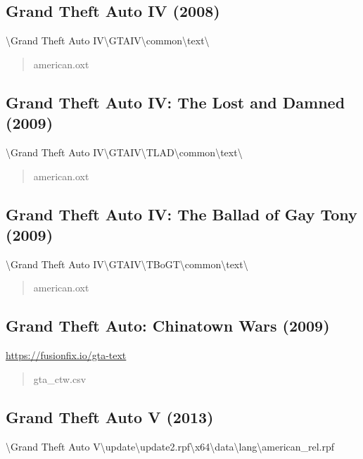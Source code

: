 \documentclass[]{scrartcl}
\begin{document}
\subsection*{Grand Theft Auto IV (2008)}
\textbackslash{}Grand Theft Auto IV\textbackslash{}GTAIV\textbackslash{}common\textbackslash{}text\textbackslash{}

\begin{quote}
   \ttfamily
   american.oxt
\end{quote}


\subsection*{Grand Theft Auto IV: The Lost and Damned (2009)}
\textbackslash{}Grand Theft Auto IV\textbackslash{}GTAIV\textbackslash{}TLAD\textbackslash{}common\textbackslash{}text\textbackslash{}

\begin{quote}
   \ttfamily
   american.oxt
\end{quote}


\subsection*{Grand Theft Auto IV: The Ballad of Gay Tony (2009)}
\textbackslash{}Grand Theft Auto IV\textbackslash{}GTAIV\textbackslash{}TBoGT\textbackslash{}common\textbackslash{}text\textbackslash{}

\begin{quote}
   \ttfamily
   american.oxt
\end{quote}


\subsection*{Grand Theft Auto: Chinatown Wars (2009)}
\url{https://fusionfix.io/gta-text}

\begin{quote}
   \ttfamily
   gta\_ctw.csv
\end{quote}


\subsection*{Grand Theft Auto V (2013)}
\textbackslash{}Grand Theft Auto V\textbackslash{}update\textbackslash{}update2.rpf\textbackslash{}x64\textbackslash{}data\textbackslash{}lang\textbackslash{}american\_rel.rpf
\end{document}

